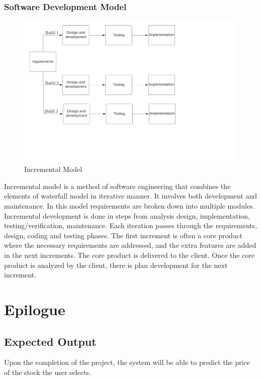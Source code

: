 \subsection{Software Development Model}
\vspace{-18pt}
 \begin{figure}[tbh] %
\begin{center}
	\includegraphics[width=8in]{images/sdlc1.png} 
	\caption{Incremental Model} %
	\label{Incremental Model} %
\end{center}
\end{figure}
 Incremental model is a method of software engineering that combines the elements of waterfall model in iterative manner. It involves both development and maintenance. In this model requirements are broken down into multiple modules. Incremental development is done in steps from analysis design, implementation, testing/verification, maintenance. Each iteration passes through the requirements, design, coding and testing phases. The first increment is often a core product where the necessary requirements are addressed, and the extra features are added in the next increments. The core product is delivered to the client. Once the core product is analyzed by the client, there is plan development for the next increment.\\
\chapter{Epilogue}
\section{Expected Output}
\vspace{-18pt}
Upon the completion of the project, the system will be able to predict the price of the stock the user selects.
\renewcommand\bibname{References} %

